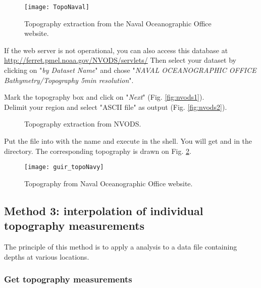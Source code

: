 \begin{figure}[htpb]
\centering
\texttt{[image: TopoNaval]}
\caption{Topography extraction from the Naval Oceanographic Office website.\label{fig:topoextract}}
\end{figure}

If the web server is not operational, you can also access this database at \url{http://ferret.pmel.noaa.gov/NVODS/servlets/}
Then select your dataset by clicking on "\textsl{by Dataset Name}" and chose 
"\textsl{NAVAL OCEANOGRAPHIC OFFICE Bathymetry/Topography 5min resolution}".

Mark the topography box and click on "\textsl{Next}" (Fig. \ref{fig:nvods1}).\\
Delimit your region and select "ASCII file" as output (Fig. \ref{fig:nvods2}). 


\begin{figure}[htpb]
\centering
{}

\caption{Topography extraction from NVODS.}
\end{figure}


Put the  file into  with the name  and execute  in the shell. You will get  and  in the  directory. The corresponding topography is drawn on Fig. \ref{fig:topoNaval}.


\begin{figure}[htpb]
\centering
\texttt{[image: guir\_topoNavy]}
\caption{Topography from Naval Oceanographic Office website.\label{fig:topoNaval}}
\end{figure}


\subsection{Method 3: interpolation of individual topography measurements\label{sec:topotopex}}

The principle of this method is to apply a \diva analysis to a data file containing depths at various locations.

\subsubsection{Get topography measurements}

